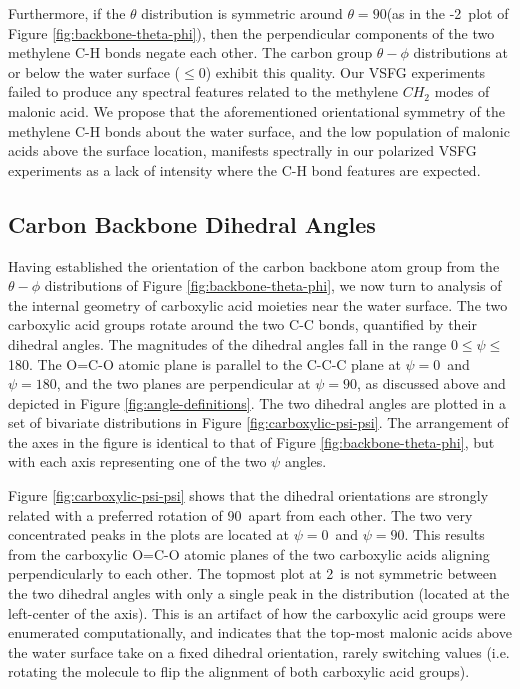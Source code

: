 Furthermore, if the $\theta$ distribution is symmetric around $\theta=90$\textdegree (as in the -2\angs~plot of Figure \ref{fig:backbone-theta-phi}), then the perpendicular components of the two methylene C-H bonds negate each other. The carbon group $\theta-\phi$ distributions at or below the water surface ($\le 0$\angs) exhibit this quality. Our VSFG experiments failed to produce any spectral features related to the methylene $CH_2$ modes of malonic acid. We propose that the aforementioned orientational symmetry of the methylene C-H bonds about the water surface, and the low population of malonic acids above the surface location, manifests spectrally in our polarized VSFG experiments as a lack of intensity where the C-H bond features are expected. 

\subsection {Carbon Backbone Dihedral Angles}

Having established the orientation of the carbon backbone atom group from the $\theta-\phi$ distributions of Figure \ref{fig:backbone-theta-phi}, we now turn to analysis of the  internal geometry of carboxylic acid moieties near the water surface. The two carboxylic acid groups rotate around the two C-C bonds, quantified by their dihedral angles. The magnitudes of the dihedral angles fall in the range 0\textdegree$\le \psi \le$180\textdegree. The O=C-O atomic plane is parallel to the C-C-C plane at $\psi=0$\textdegree~and $\psi=180$\textdegree, and the two planes are perpendicular at $\psi=90$\textdegree, as discussed above and depicted in Figure \ref{fig:angle-definitions}. The two dihedral angles are plotted in a set of bivariate distributions in Figure \ref{fig:carboxylic-psi-psi}. The arrangement of the axes in the figure is identical to that of Figure \ref{fig:backbone-theta-phi}, but with each axis representing one of the two $\psi$ angles.

Figure \ref{fig:carboxylic-psi-psi} shows that the dihedral orientations are strongly related with a preferred rotation of 90\textdegree~apart from each other. The two very concentrated peaks in the plots are located at $\psi=0$\textdegree~and $\psi=90$\textdegree. This results from the carboxylic O=C-O atomic planes of the two carboxylic acids aligning perpendicularly to each other. The topmost plot at 2\angs~is not symmetric between the two dihedral angles with only a single peak in the distribution (located at the left-center of the axis). This is an artifact of how the carboxylic acid groups were enumerated computationally, and indicates that the top-most malonic acids above the water surface take on a fixed dihedral orientation, rarely switching values (i.e. rotating the molecule to flip the alignment of both carboxylic acid groups).



